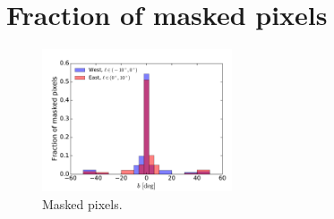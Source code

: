 \section{Fraction of masked pixels}

\begin{figure}[h]
\centering
\includegraphics[width=0.5\textwidth]{plots/Fraction_masked_pixels.pdf}
\caption{Masked pixels.}
\label{fig:masked_pixels}
\end{figure}